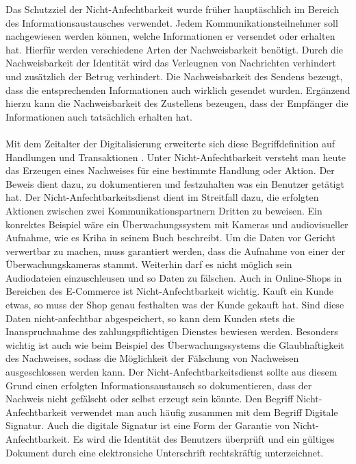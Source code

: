 \documentclass[utf8,biblatex]{lni}
\begin{document}
Das Schutzziel der Nicht-Anfechtbarkeit wurde früher hauptäschlich im Bereich des Informationsaustausches verwendet. Jedem Kommunikationsteilnehmer soll nachgewiesen werden können, welche Informationen er 
versendet oder erhalten hat. Hierfür werden verschiedene Arten der Nachweisbarkeit benötigt. Durch die Nachweisbarkeit der Identität wird das Verleugnen von Nachrichten verhindert und zusätzlich der Betrug verhindert.
Die Nachweisbarkeit des Sendens bezeugt, dass die entsprechenden Informationen auch wirklich gesendet wurden. Ergänzend hierzu kann die Nachweisbarkeit des Zustellens bezeugen, dass der Empfänger die Informationen
auch tatsächlich erhalten hat. \cite{Bedner.2010}
\\\\
Mit dem Zeitalter der Digitalisierung erweiterte sich diese Begriffdefinition auf Handlungen und Transaktionen \cite{Bedner.2010}.
Unter Nicht-Anfechtbarkeit versteht man heute das Erzeugen eines Nachweises für eine bestimmte Handlung oder Aktion. Der Beweis dient dazu, zu dokumentieren und festzuhalten was ein Benutzer getätigt hat. 
Der Nicht-Anfechtbarkeitsdienst
dient im Streitfall dazu, die erfolgten Aktionen zwischen zwei Kommunikationspartnern Dritten zu beweisen.
Ein konrektes Beispiel wäre ein Überwachungssystem mit Kameras und audiovisueller Aufnahme, wie es Kriha in seinem Buch \cite{Kriha.2008} beschreibt. Um die Daten vor Gericht verwertbar zu machen, muss garantiert werden, dass die Aufnahme von einer der Überwachungskameras stammt.
Weiterhin darf es nicht möglich sein Audiodateien einzuschleusen und so Daten zu fälschen. Auch in Online-Shops in Bereichen des E-Commerce ist Nicht-Anfechtbarkeit wichtig.
Kauft ein Kunde etwas, so muss der Shop genau festhalten was der Kunde gekauft hat. Sind diese Daten nicht-anfechtbar abgespeichert, so kann dem Kunden stets die Inanspruchnahme des zahlungspflichtigen Dienstes
bewiesen werden. Besonders wichtig ist auch wie beim Beispiel des Überwachungssystems die Glaubhaftigkeit des Nachweises, sodass die Möglichkeit der Fälschung von Nachweisen ausgeschlossen werden kann.
Der Nicht-Anfechtbarkeitsdienst sollte aus diesem Grund einen erfolgten Informationsaustausch so dokumentieren, dass der Nachweis nicht gefälscht oder selbst erzeugt sein könnte. 
Den Begriff Nicht-Anfechtbarkeit verwendet man auch häufig zusammen mit dem Begriff \glqq Digitale Signatur\grqq{}. Auch die digitale Signatur ist eine Form der Garantie von Nicht-Anfechtbarkeit. 
Es wird die Identität des Benutzers überprüft und ein gültiges Dokument durch eine elektronsiche Unterschrift rechtskräftig unterzeichnet.\cite{Bedner.2010} \cite{Kriha.2008}
\end{document}
